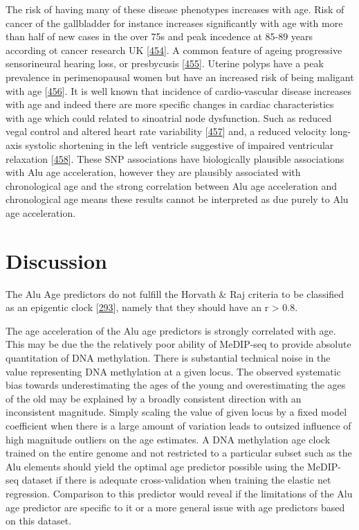 \documentclass[
]{book}
\begin{document}
The risk of having many of these disease phenotypes increases with age.
Risk of cancer of the gallbladder for instance increases significantly with age with more than half of new cases in the over 75s and peak incedence at 85-89 years according ot cancer research UK {[}\protect\hyperlink{ref-CancerResearchUK2020}{454}{]}.
A common feature of ageing progressive sensorineural hearing loss, or presbycusis {[}\protect\hyperlink{ref-Lohler2019}{455}{]}.
Uterine polyps have a peak prevalence in perimenopausal women but have an increased risk of being maligant with age {[}\protect\hyperlink{ref-Hileeto2005}{456}{]}.
It is well known that incidence of cardio-vascular disease increases with age and indeed there are more specific changes in cardiac characteristics with age which could related to sinoatrial node dysfunction.
Such as reduced vegal control and altered heart rate variability {[}\protect\hyperlink{ref-Abhishekh2013}{457}{]} and, a reduced velocity long-axis systolic shortening in the left ventricle suggestive of impaired ventricular relaxation {[}\protect\hyperlink{ref-Nikitin2005}{458}{]}.
These SNP associations have biologically plausible associations with Alu age acceleration, however they are plausibly associated with chronological age and the strong correlation between Alu age acceleration and chronological age means these results cannot be interpreted as due purely to Alu age acceleration.

\newpage

\hypertarget{Alu-Discussion}{%
\section{Discussion}\label{Alu-Discussion}}

The Alu Age predictors do not fulfill the Horvath \& Raj criteria to be classified as an epigentic clock {[}\protect\hyperlink{ref-Horvath2018}{293}{]}, namely that they should have an r \textgreater{} 0.8.

The age acceleration of the Alu age predictors is strongly correlated with age.
This may be due the the relatively poor ability of MeDIP-seq to provide absolute quantitation of DNA methylation.
There is substantial technical noise in the value representing DNA methylation at a given locus.
The observed systematic bias towards underestimating the ages of the young and overestimating the ages of the old may be explained by a broadly consistent direction with an inconsistent magnitude.
Simply scaling the value of given locus by a fixed model coefficient when there is a large amount of variation leads to outsized influence of high magnitude outliers on the age estimates.
A DNA methylation age clock trained on the entire genome and not restricted to a particular subset such as the Alu elements should yield the optimal age predictor possible using the MeDIP-seq dataset if there is adequate cross-validation when training the elastic net regression.
Comparison to this predictor would reveal if the limitations of the Alu age predictor are specific to it or a more general issue with age predictors based on this dataset.
\end{document}
